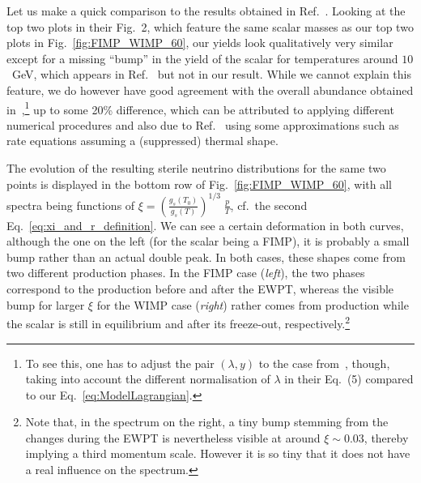 Let us make a quick comparison to the results obtained in Ref.~\cite{Adulpravitchai:2014xna}. Looking at the top two plots in their Fig.~2, which feature the same scalar masses as our top two plots in Fig.~\ref{fig:FIMP_WIMP_60}, our yields look qualitatively very similar except for a missing ``bump'' in the yield of the scalar for temperatures around $10$~GeV, which appears in Ref.~\cite{Adulpravitchai:2014xna} but not in our result. While we cannot explain this feature, we do however have good agreement with the overall abundance obtained in~\cite{Adulpravitchai:2014xna},\footnote{To see this, one has to adjust the pair $(\lambda,y)$ to the case from~\cite{Adulpravitchai:2014xna}, though, taking into account the different normalisation of $\lambda$ in their Eq.~(5) compared to our Eq.~\eqref{eq:ModelLagrangian}.} up to some 20\% difference, which can be attributed to applying different numerical procedures and also due to Ref.~\cite{Adulpravitchai:2014xna} using some approximations such as rate equations assuming a (suppressed) thermal shape.

The evolution of the resulting sterile neutrino distributions for the same two points is displayed in the bottom row of Fig.~\ref{fig:FIMP_WIMP_60}, with all spectra being functions of $\xi = \left( \frac{g_{s}(T_0)}{g_{s}(T)} \right)^{1/3}\;\frac{p}{T}$, cf.\ the second Eq.~\eqref{eq:xi_and_r_definition}. We can see a certain deformation in both curves, although the one on the left (for the scalar being a FIMP), it is probably a small bump rather than an actual double peak. In both cases, these shapes come from two different production phases. In the FIMP case (\emph{left}), the two phases correspond to the production before and after the EWPT, whereas the visible bump for larger $\xi$ for the WIMP case (\emph{right}) rather comes from production while the scalar is still in equilibrium and after its freeze-out, respectively.\footnote{Note that, in the spectrum on the right, a tiny bump stemming from the changes during the EWPT is nevertheless visible at around $\xi \sim 0.03$, thereby implying a third momentum scale. However it is so tiny that it does not have a real influence on the spectrum.}

